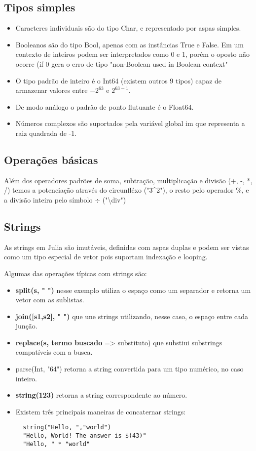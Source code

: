 \subsection{Tipos simples}
\begin{itemize}
    \item Caracteres individuais são do tipo Char, e representado por aspas simples.
    \item Booleanos são do tipo Bool, apenas com as instâncias True e False. Em um contexto de inteiros podem ser interpretados como 0 e 1, porém o oposto não ocorre (if 0 gera o erro de tipo "non-Boolean used in Boolean context"
    \item O tipo padrão de inteiro é o Int64 (existem outros 9 tipos) capaz de armazenar valores entre $-2^{63}$ e $2^{63-1}$.
    \item De modo análogo o padrão de ponto flutuante é o Float64.
    \item Números complexos são suportados pela variável global im que representa a raiz quadrada de -1.
\end{itemize}

\subsection{Operações básicas}
Além dos operadores padrões de soma, subtração, multiplicação e divisão (+, -, *, /) temos a potenciação através do circunfléxo ("3\^{}2"), o resto pelo operador \%, e a divisão inteira pelo símbolo $\div$ ("\textbackslash div")

\subsection{Strings}
As strings em Julia são imutáveis, definidas com aspas duplas e podem ser vistas como um tipo especial de vetor pois suportam indexação e looping.


Algumas das operações típicas com strings são:
\begin{itemize}
    \item \textbf{split(s, " ")} nesse exemplo utiliza o espaço como um separador e retorna um vetor com as sublistas.
    \item \textbf{join([s1,s2], " ")} que une strings utilizando, nesse caso, o espaço entre cada junção.
    \item \textbf{replace(s, {termo buscado}} => {substituto}) que substiui substrings compatíveis com a busca.
    \item parse(Int, "64") retorna a string convertida para um tipo numérico, no caso inteiro.
    \item \textbf{string(123)} retorna a string correspondente ao número.
    \item Existem três principais maneiras de concaternar strings:
        \subitem 
        \begin{lstlisting}    
  string("Hello, ","world")
  "Hello, World! The answer is $(43)"
  "Hello, " * "world"
        \end{lstlisting}
        
\end{itemize}


